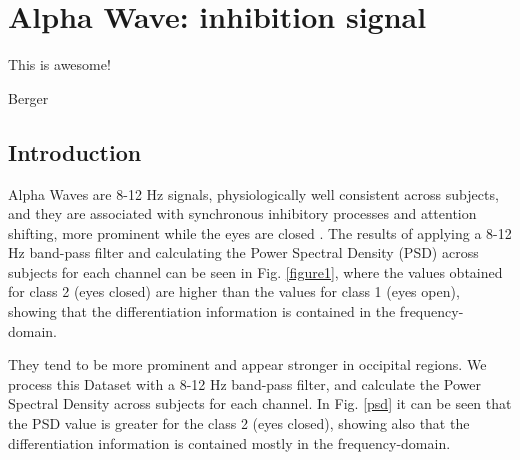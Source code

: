 \chapter{Alpha Wave: inhibition signal}

\epigraph{This is awesome!}{Berger}

\section{Introduction}


Alpha Waves are 8-12 Hz signals, physiologically well consistent across subjects, and they are associated with synchronous inhibitory processes and attention shifting, more prominent while the eyes are closed \cite{c3}. The results of applying a 8-12 Hz band-pass filter and calculating the Power Spectral Density (PSD) across subjects for each channel can be seen in Fig. \ref{figure1}, where the values obtained for class 2 (eyes closed) are higher than the values for class 1 (eyes open), showing that the differentiation information is contained in the frequency-domain.
 
They tend to be more prominent  and appear stronger in occipital regions. We process this Dataset with a 8-12 Hz band-pass filter, and calculate the Power Spectral Density across subjects for each channel.  In Fig. \ref{psd} it can be seen that the PSD value is greater for the class 2 (eyes closed), showing also that the differentiation information is contained mostly in the frequency-domain.



